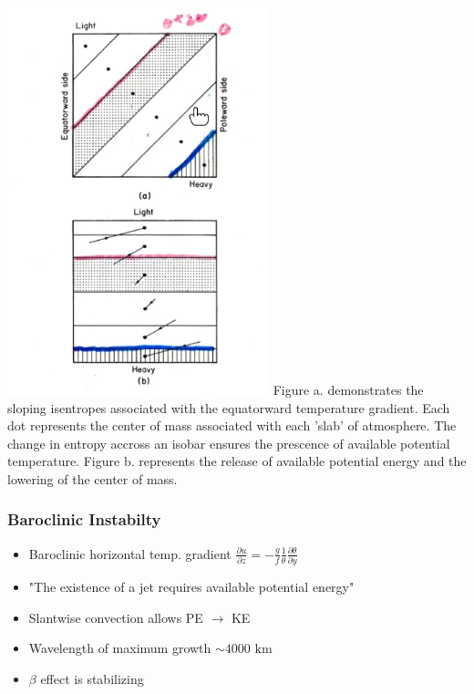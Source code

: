 \documentclass[a4paper,12pt]{article}
\begin{document}
\includegraphics[width=\textwidth]{bcli_1}
Figure a. demonstrates the sloping isentropes associated with the equatorward temperature gradient. Each dot represents the center of mass associated with each 'slab' of atmosphere. The change in entropy accross an isobar ensures the prescence of available potential temperature.  Figure b. represents the release of available potential energy and the lowering of the center of mass.

\subsubsection*{Baroclinic Instabilty}

\begin{itemize}
	\item Baroclinic horizontal temp. gradient $\frac{\partial u}{\partial z} = -\frac{g}{f}\frac{1}{\theta}\frac{\partial \theta}{\partial y}$
	\item "The existence of a jet requires available potential energy"
	\item Slantwise convection allows PE $\rightarrow$ KE
	\item Wavelength of maximum growth $\sim 4000 \text{ km}$
	\item $\beta$ effect is stabilizing
\end{itemize}
\end{document}
